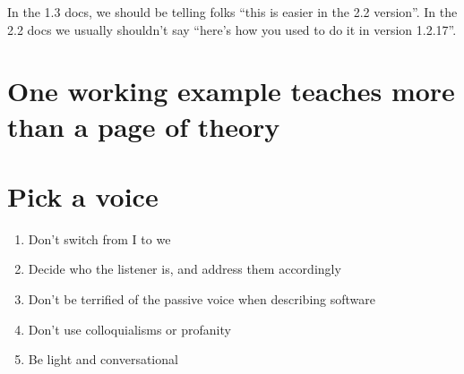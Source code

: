 In the 1.3 docs, we should be telling folks ``this is easier in the 2.2
version''. In the 2.2 docs we usually shouldn't say ``here's how you
used to do it in version 1.2.17''.

\section{One working example teaches more than a page of theory}

\section{Pick a voice}
\begin{enumerate}
\item Don't switch from I to we
\item Decide who the listener is, and address them accordingly
\item Don't be terrified of the passive voice when describing software
\item Don't use colloquialisms or profanity
\item Be light and conversational
\end{enumerate}
